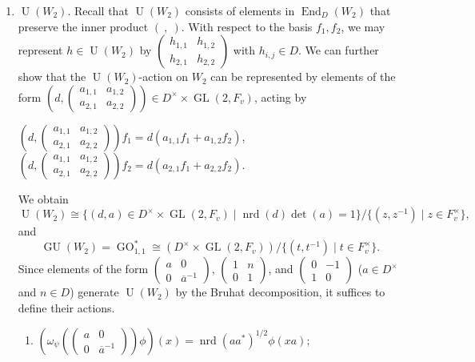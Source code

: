 \documentclass[11pt]{article}
\theoremstyle{plain}
\theoremstyle{remark}
\theoremstyle{definition}
\DeclareMathOperator{\End}{End}
\DeclareMathOperator{\GL}{GL}
\DeclareMathOperator{\U}{U}
\DeclareMathOperator{\GU}{GU}
\DeclareMathOperator{\nrd}{nrd}
\DeclareMathOperator{\GO}{GO}
\begin{document}
\begin{enumerate}
    \item \underline{$\U(W_2)$}.
    Recall that $\U(W_2)$ consists of elements in $\End_{D}(W_2)$ that preserve the inner product $(~,~)$.
    With respect to the basis $f_1,f_2$, we may represent $h\in \U(W_2)$ by
    $\begin{pmatrix}
h_{1,1} & h_{1,2} \\
h_{2,1} & h_{2,2}
\end{pmatrix}$ with $h_{i,j}\in D$.
We can further show that the $\U(W_2)$-action on $W_2$ can be represented by elements of the form
    $(d,\begin{pmatrix}
a_{1,1} & a_{1,2} \\
a_{2,1} & a_{2,2}
\end{pmatrix})\in D^{\times}\times \GL(2,F_{v})$, acting by
\begin{center}
    $(d,\begin{pmatrix}
a_{1,1} & a_{1,2} \\
a_{2,1} & a_{2,2}
\end{pmatrix})f_1 = d(a_{1,1}f_{1}+a_{1,2}f_{2})$,\\
    $(d,\begin{pmatrix}
a_{1,1} & a_{1,2} \\
a_{2,1} & a_{2,2}
\end{pmatrix})f_2 = d(a_{2,1}f_{1}+a_{2,2}f_{2})$.
\end{center}
We obtain
\[
\U(W_2)\cong \{(d,a)\in D^{\times}\times \GL(2,F_{v})\mid \nrd(d)\det(a)=1\}/\{(z,z^{-1})\mid z\in F_{v}^{\times}\},
\]
and
\[
\GU(W_2)=\GO_{1,1}^{*}\cong (D^{\times}\times \GL(2,F_{v}))/\{(t,t^{-1})\mid t\in F_{v}^{\times}\}.
\]
Since elements of the form
$\begin{pmatrix}
a & 0 \\
0 & \overline{a}^{-1}
\end{pmatrix}$,
$\begin{pmatrix}
1 & n \\
0 & 1
\end{pmatrix}$, and
$\begin{pmatrix}
0 & -1 \\
1 & 0
\end{pmatrix}$
($a\in D^{\times}$ and $n\in D$) generate $\U(W_2)$ by the Bruhat decomposition, it suffices to define their actions.
\begin{enumerate}
\item $(\omega_{\psi}(\begin{pmatrix}
a & 0 \\
0 & \overline{a}^{-1}
\end{pmatrix})\phi)(x)=\nrd(aa^*)^{1/2}\phi(xa)$;

\end{enumerate}
\end{enumerate}
\end{document}
